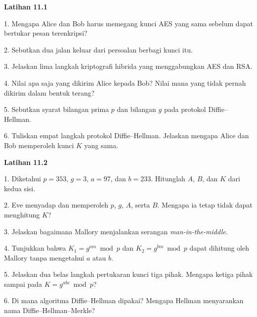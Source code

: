 \begin{obereflection}
\textbf{Latihan 11.1}

1. Mengapa Alice dan Bob harus memegang kunci AES yang sama sebelum dapat
   bertukar pesan terenkripsi?

2. Sebutkan dua jalan keluar dari persoalan berbagi kunci itu.

3. Jelaskan lima langkah kriptografi hibrida yang menggabungkan AES dan RSA.

4. Nilai apa saja yang dikirim Alice kepada Bob? Nilai mana yang tidak pernah
   dikirim dalam bentuk terang?

5. Sebutkan syarat bilangan prima $p$ dan bilangan $g$ pada protokol
   Diffie--Hellman.

6. Tuliskan empat langkah protokol Diffie--Hellman. Jelaskan mengapa Alice dan
   Bob memperoleh kunci $K$ yang sama.
\end{obereflection}

\begin{obereflection}
\textbf{Latihan 11.2}

1. Diketahui $p = 353$, $g = 3$, $a = 97$, dan $b = 233$. Hitunglah $A$, $B$,
   dan $K$ dari kedua sisi.

2. Eve menyadap dan memperoleh $p$, $g$, $A$, serta $B$. Mengapa ia tetap tidak
   dapat menghitung $K$?

3. Jelaskan bagaimana Mallory menjalankan serangan
   \textit{man-in-the-middle}.

4. Tunjukkan bahwa $K_1 = g^{am} \bmod p$ dan $K_2 = g^{bm} \bmod p$ dapat
   dihitung oleh Mallory tanpa mengetahui $a$ atau $b$.

5. Jelaskan dua belas langkah pertukaran kunci tiga pihak. Mengapa ketiga pihak
   sampai pada $K = g^{abc} \bmod p$?

6. Di mana algoritma Diffie--Hellman dipakai? Mengapa Hellman menyarankan nama
   Diffie--Hellman--Merkle?
\end{obereflection}
